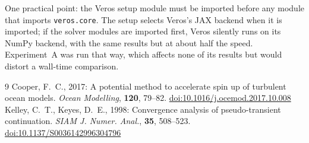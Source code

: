 \documentclass{article}
\begin{document}
One practical point: the Veros setup module must be imported before any module that imports \texttt{veros.core}. The setup selects Veros's JAX backend when it is imported; if the solver modules are imported first, Veros silently runs on its NumPy backend, with the same results but at about half the speed. Experiment~A was run that way, which affects none of its results but would distort a wall-time comparison.

\begin{thebibliography}{9}
 Cooper, F.~C., 2017: A potential method to accelerate spin up of turbulent ocean models. \textit{Ocean Modelling}, \textbf{120}, 79--82. \href{https://doi.org/10.1016/j.ocemod.2017.10.008}{doi:10.1016/j.ocemod.2017.10.008}
 Kelley, C.~T., Keyes, D.~E., 1998: Convergence analysis of pseudo-transient continuation. \textit{SIAM J. Numer. Anal.}, \textbf{35}, 508--523. \href{https://doi.org/10.1137/S0036142996304796}{doi:10.1137/S0036142996304796}
\end{thebibliography}
\end{document}
